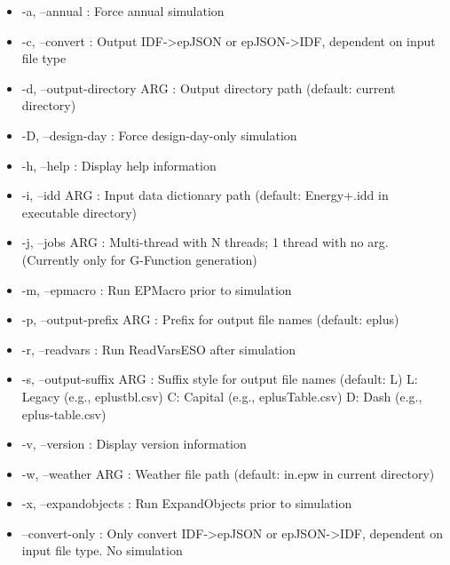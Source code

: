 \begin{itemize}

\item
  -a, --annual : Force annual simulation

\item
  -c, --convert : Output IDF->epJSON or epJSON->IDF, dependent on input file type

\item
  -d, --output-directory ARG : Output directory path (default: current directory)
  
\item
  -D, --design-day : Force design-day-only simulation

\item
  -h, --help : Display help information
  
\item
  -i, --idd ARG : Input data dictionary path (default: Energy+.idd in executable directory)

\item
  -j, --jobs ARG : Multi-thread with N threads; 1 thread with no arg. (Currently only for G-Function generation)
  
\item
  -m, --epmacro : Run EPMacro prior to simulation

\item
  -p, --output-prefix ARG : Prefix for output file names (default: eplus)

\item
  -r, --readvars : Run ReadVarsESO after simulation

\item
  -s, --output-suffix ARG : Suffix style for output file names (default: L)
  L: Legacy (e.g., eplustbl.csv)
  C: Capital (e.g., eplusTable.csv)
  D: Dash (e.g., eplus-table.csv)
  
\item
  -v, --version : Display version information
  
\item
  -w, --weather ARG : Weather file path (default: in.epw in current directory)

\item
  -x, --expandobjects : Run ExpandObjects prior to simulation
  
\item
  --convert-only : Only convert IDF->epJSON or epJSON->IDF, dependent on input file type. No simulation
  
\end{itemize}

